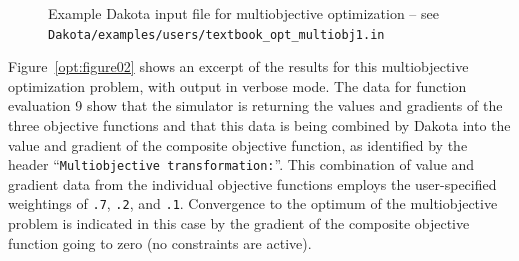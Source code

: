 \begin{figure}
\centering
\begin{bigbox}
\begin{small}
\end{small}
\end{bigbox}
\caption{Example Dakota input file for multiobjective optimization --
see \texttt{Dakota/examples/users/textbook\_opt\_multiobj1.in} }
\label{opt:figure01}
\end{figure}

Figure~\ref{opt:figure02} shows an excerpt of the results for this
multiobjective optimization problem, with output in verbose mode. The
data for function evaluation 9 show that the simulator is returning
the values and gradients of the three objective functions and that
this data is being combined by Dakota into the value and gradient of
the composite objective function, as identified by the header
``\texttt{Multiobjective transformation:}''. This combination of value
and gradient data from the individual objective functions employs the
user-specified weightings of \texttt{.7}, \texttt{.2}, and
\texttt{.1}. Convergence to the optimum of the multiobjective problem
is indicated in this case by the gradient of the composite objective
function going to zero (no constraints are active).

